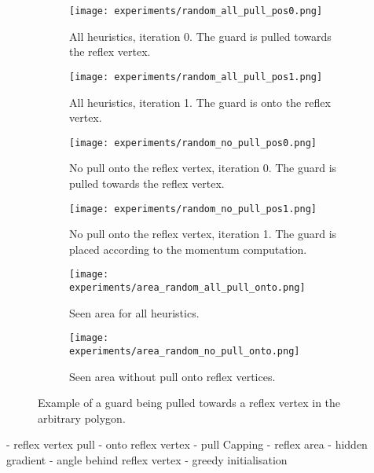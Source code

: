 \begin{figure}[h!]
    \centering
    \begin{subfigure}{0.45\textwidth}
        \texttt{[image: experiments/random\_all\_pull\_pos0.png]}
        \caption{All heuristics, iteration 0. The guard is pulled towards the reflex vertex.}
        \label{fig:all_pull_pos0}
    \end{subfigure}
    \hfill
    \begin{subfigure}{0.45\textwidth}
        \texttt{[image: experiments/random\_all\_pull\_pos1.png]}
        \caption{All heuristics, iteration 1. The guard is onto the reflex vertex.}
        \label{fig:all_pull_pos1}
    \end{subfigure}
    \vfill
    \begin{subfigure}{0.45\textwidth}
        \texttt{[image: experiments/random\_no\_pull\_pos0.png]}
        \caption{No pull onto the reflex vertex, iteration 0. The guard is pulled towards the reflex vertex.}
        \label{fig:no_pull_pos0}
    \end{subfigure}
    \hfill
    \begin{subfigure}{0.45\textwidth}
        \texttt{[image: experiments/random\_no\_pull\_pos1.png]}
        \caption{No pull onto the reflex vertex, iteration 1. The guard is placed according to the momentum computation.}
        \label{fig:no_pull_pos1}
    \end{subfigure}
    \vfill
    \begin{subfigure}{0.45\textwidth}
        \texttt{[image: experiments/area\_random\_all\_pull\_onto.png]}
        \caption{Seen area for all heuristics.}
        \label{fig:area_all_pull}
    \end{subfigure}
    \hfill
    \begin{subfigure}{0.45\textwidth}
        \texttt{[image: experiments/area\_random\_no\_pull\_onto.png]}
        \caption{Seen area without pull onto reflex vertices.}
        \label{fig:area_no_pull}
    \end{subfigure}
    \caption{Example of a guard being pulled towards a reflex vertex in the arbitrary polygon.}
    \label{fig:no_pull}
\end{figure}


- reflex vertex pull
    - onto reflex vertex
    - pull Capping
- reflex area
- hidden gradient
- angle behind reflex vertex
- greedy initialisation